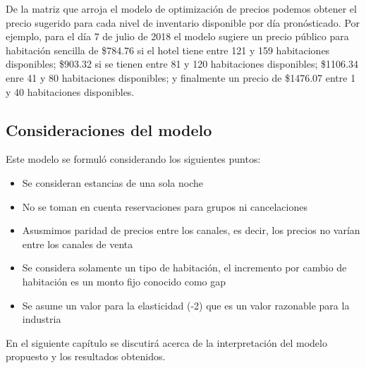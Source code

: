 De la matriz que arroja el modelo de optimización de precios podemos obtener el precio sugerido para cada nivel de inventario disponible por día pronósticado. Por ejemplo, para el día 7 de julio de 2018 el modelo sugiere un precio público para habitación sencilla de \$784.76 si el hotel tiene entre 121 y 159 habitaciones disponibles; \$903.32 si se tienen entre 81 y 120 habitaciones disponibles; \$1106.34 enre 41 y 80 habitaciones disponibles; y finalmente un precio de \$1476.07 entre 1 y 40 habitaciones disponibles.

\subsection*{Consideraciones del modelo}

Este modelo se formuló considerando los siguientes puntos:
\begin{itemize}[noitemsep]
  \item Se consideran estancias de una sola noche
  \item No se toman en cuenta reservaciones para grupos ni cancelaciones
  \item Asusmimos paridad de precios entre los canales, es decir, los precios no varían entre los canales de venta
  \item Se considera solamente un tipo de habitación, el incremento por cambio de habitación es un monto fijo conocido como gap
  \item Se asume un valor para la elasticidad (-2) que es un valor razonable para la industria
\end{itemize}

En el siguiente capítulo se discutirá acerca de la interpretación del modelo propuesto y los resultados obtenidos.
